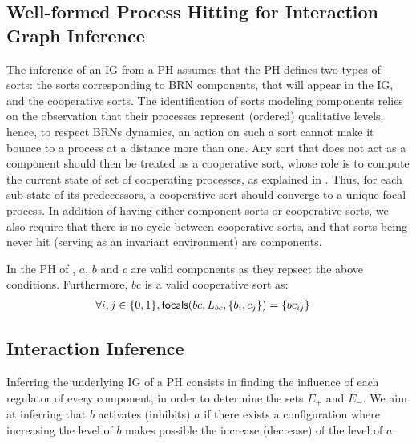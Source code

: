 \subsection{Well-formed Process Hitting for Interaction Graph Inference}\label{ssec:wf}

The inference of an IG from a PH assumes that the PH defines two types of sorts: the sorts corresponding to BRN components, that will appear in the IG, and the cooperative sorts.
The identification of sorts modeling components relies on the observation that their processes represent (ordered) qualitative levels;
hence, to respect BRNs dynamics, an action on such a sort cannot make it bounce to a process at a distance more than one.
Any sort that does not act as a component should then be treated as a cooperative sort, whose role is to compute the current state of set of cooperating processes, as explained in .
Thus, for each sub-state of its predecessors, a cooperative sort should converge to a unique focal process.
In addition of having either component sorts or cooperative sorts, we also require that there is no cycle between cooperative sorts, and that sorts being never hit (\ie serving as an invariant environment) are components.

\begin{example*}
In the PH of ,
$a$, $b$ and $c$ are valid components as they repsect the above conditions.
Furthermore, $bc$ is a valid cooperative sort as:
\begin{align*}
\forall i, j \in \{0, 1\}, \mathsf{focals}(bc, L_{bc}, \{b_i, c_j\}) &= \{bc_{ij}\}
\end{align*}
\end{example*}



\subsection{Interaction Inference}\label{ssec:infer-IG}

Inferring the underlying IG of a PH consists in finding the influence of each regulator of every component, in order to determine the sets $E_+$ and $E_-$.
We aim at inferring that $b$ activates (inhibits) $a$ if there exists a configuration where increasing the level of $b$ makes possible the increase (decrease) of the level of $a$.

